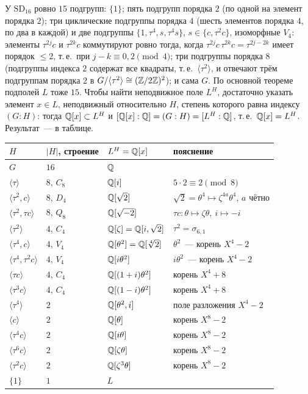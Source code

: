 У $\mathrm{SD}_{16}$ ровно $15$ подгрупп: $\{1\}$; пять подгрупп порядка $2$ (по одной на элемент порядка $2$); три
циклические подгруппы порядка $4$ (шесть элементов порядка $4$, по два в каждой) и две подгруппы $\{1,\tau^4,s,\tau^4s\}$,
$s\in\{c,\tau^2c\}$, изоморфные $V_4$: элементы $\tau^{2j}c$ и $\tau^{2k}c$ коммутируют ровно тогда, когда $\tau^{2j}c\,\tau^{2k}c=\tau^{2j-2k}$ имеет
порядок $\le2$, т.\,е.\ при $j-k\equiv0,2\pmod4$; три подгруппы порядка $8$ (подгруппы индекса $2$ содержат все квадраты,
т.\,е.\ $\langle\tau^2\rangle$, и отвечают трём подгруппам порядка $2$ в $G/\langle\tau^2\rangle\cong(\mathbb Z/2\mathbb Z)^2$); и сама $G$.
По основной теореме  подполей $L$ тоже $15$. Чтобы найти неподвижное поле $L^H$, достаточно указать элемент $x\in L$,
неподвижный относительно $H$, степень которого равна индексу $(G:H)$: тогда $\mathbb Q[x]\subset L^H$ и
$[\mathbb Q[x]:\mathbb Q]=(G:H)=[L^H:\mathbb Q]$, т.\,е.\ $\mathbb Q[x]=L^H$. Результат~--- в таблице.

\begin{center}
\begin{keepfig}
\centering
\small
\begin{tabular}{llll}
\toprule
$H$ & $|H|$, строение & $L^H=\mathbb Q[x]$ & пояснение \\
\midrule
$G$ & $16$ & $\mathbb Q$ & \\
$\langle\tau\rangle$ & $8$, $C_8$ & $\mathbb Q[i]$ & $5\cdot2\equiv2\pmod 8$ \\
$\langle\tau^2,c\rangle$ & $8$, $D_4$ & $\mathbb Q[\sqrt2]$ & $\sqrt2=\theta^4\mapsto\zeta^{4a}\theta^4$, $a$ чётно \\
$\langle\tau^2,\tau c\rangle$ & $8$, $Q_8$ & $\mathbb Q[\sqrt{-2}]$ & $\tau c\colon\theta\mapsto\zeta\theta,\ i\mapsto-i$ \\
$\langle\tau^2\rangle$ & $4$, $C_4$ & $\mathbb Q[\zeta]=\mathbb Q[i,\sqrt2]$ & $\tau^2=\sigma_{6,1}$ \\
$\langle\tau^4,c\rangle$ & $4$, $V_4$ & $\mathbb Q[\theta^2]=\mathbb Q[\sqrt[4]2]$ & $\theta^2$~--- корень $X^4-2$ \\
$\langle\tau^4,\tau^2c\rangle$ & $4$, $V_4$ & $\mathbb Q[i\theta^2]$ & $i\theta^2$~--- корень $X^4-2$ \\
$\langle\tau c\rangle$ & $4$, $C_4$ & $\mathbb Q[(1+i)\theta^2]$ & корень $X^4+8$ \\
$\langle\tau^3c\rangle$ & $4$, $C_4$ & $\mathbb Q[(1-i)\theta^2]$ & корень $X^4+8$ \\
$\langle\tau^4\rangle$ & $2$ & $\mathbb Q[\theta^2,i]$ & поле разложения $X^4-2$ \\
$\langle c\rangle$ & $2$ & $\mathbb Q[\theta]$ & корень $X^8-2$ \\
$\langle\tau^4c\rangle$ & $2$ & $\mathbb Q[i\theta]$ & корень $X^8-2$ \\
$\langle\tau^6c\rangle$ & $2$ & $\mathbb Q[\zeta\theta]$ & корень $X^8-2$ \\
$\langle\tau^2c\rangle$ & $2$ & $\mathbb Q[\zeta^3\theta]$ & корень $X^8-2$ \\
$\{1\}$ & $1$ & $L$ & \\
\bottomrule
\end{tabular}
\end{keepfig}
\end{center}

